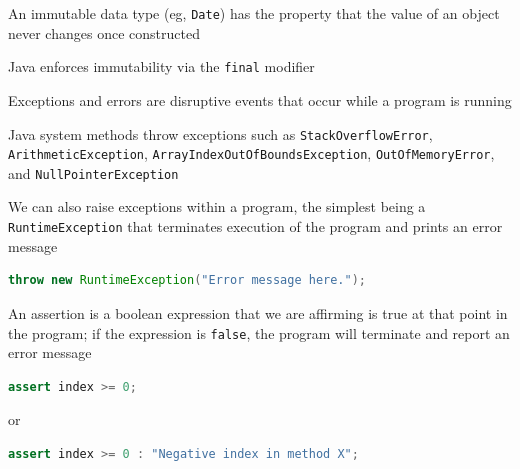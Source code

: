\documentclass[8pt,a4paper,compress]{beamer}
\begin{document}
\begin{frame}[fragile]
\pause

An immutable data type (eg, \lstinline{Date}) has the property that the value of an object never changes once constructed

\pause
\bigskip

Java enforces immutability via the \lstinline{final} modifier

\pause
\bigskip

Exceptions and errors are disruptive events that occur while a program is running

\pause
\bigskip

Java system methods throw exceptions such as  \lstinline{StackOverflowError}, \lstinline{ArithmeticException}, \lstinline{ArrayIndexOutOfBoundsException}, \lstinline{OutOfMemoryError}, and \lstinline{NullPointerException}

\pause
\bigskip

We can also raise exceptions within a program, the simplest being a \lstinline{RuntimeException} that terminates execution of the program and prints an error message
\begin{lstlisting}[language=Java]
throw new RuntimeException("Error message here.");
\end{lstlisting}

\pause
\bigskip

An assertion is a boolean expression that we are affirming is true at that point in the program; if the expression is \lstinline{false}, the program will terminate and report an error message
\begin{lstlisting}[language=Java]
assert index >= 0;
\end{lstlisting}
or
\begin{lstlisting}[language=Java]
assert index >= 0 : "Negative index in method X";
\end{lstlisting}
\end{frame}
\end{document}
